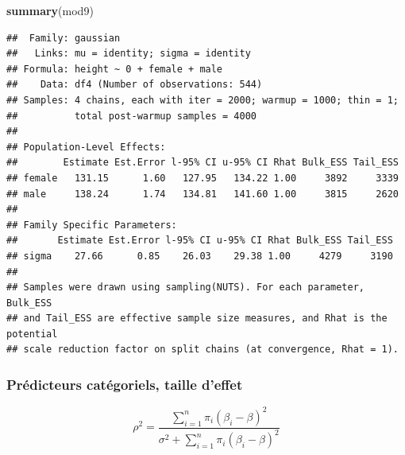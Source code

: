 \documentclass[
  a4paper,11pt,twoside,onecolumn,openright,final,oldfontcommands]{memoir}
\newenvironment{Shaded}{\begin{snugshade}}{\end{snugshade}}
\newcommand{\CommentTok}[1]{\textcolor[rgb]{0.56,0.35,0.01}{\textit{#1}}}
\newcommand{\DecValTok}[1]{\textcolor[rgb]{0.00,0.00,0.81}{#1}}
\newcommand{\KeywordTok}[1]{\textcolor[rgb]{0.13,0.29,0.53}{\textbf{#1}}}
\newcommand{\NormalTok}[1]{#1}
\newcommand{\OperatorTok}[1]{\textcolor[rgb]{0.81,0.36,0.00}{\textbf{#1}}}
\newcommand{\StringTok}[1]{\textcolor[rgb]{0.31,0.60,0.02}{#1}}
\theoremstyle{definition}
\theoremstyle{definition}
\theoremstyle{definition}
\theoremstyle{remark}
\begin{document}
\begin{Shaded}
\begin{Highlighting}[]
\KeywordTok{summary}\NormalTok{(mod9)}
\end{Highlighting}
\end{Shaded}

\begin{verbatim}
##  Family: gaussian 
##   Links: mu = identity; sigma = identity 
## Formula: height ~ 0 + female + male 
##    Data: df4 (Number of observations: 544) 
## Samples: 4 chains, each with iter = 2000; warmup = 1000; thin = 1;
##          total post-warmup samples = 4000
## 
## Population-Level Effects: 
##        Estimate Est.Error l-95% CI u-95% CI Rhat Bulk_ESS Tail_ESS
## female   131.15      1.60   127.95   134.22 1.00     3892     3339
## male     138.24      1.74   134.81   141.60 1.00     3815     2620
## 
## Family Specific Parameters: 
##       Estimate Est.Error l-95% CI u-95% CI Rhat Bulk_ESS Tail_ESS
## sigma    27.66      0.85    26.03    29.38 1.00     4279     3190
## 
## Samples were drawn using sampling(NUTS). For each parameter, Bulk_ESS
## and Tail_ESS are effective sample size measures, and Rhat is the potential
## scale reduction factor on split chains (at convergence, Rhat = 1).
\end{verbatim}

\hypertarget{pruxe9dicteurs-catuxe9goriels-taille-deffet}{%
\subsubsection{Prédicteurs catégoriels, taille d'effet}\label{pruxe9dicteurs-catuxe9goriels-taille-deffet}}

\[
\rho^{2} = \dfrac{\sum_{i=1}^{n} \pi_{i}(\beta_{i} - \beta)^{2}}{\sigma^{2} + \sum_{i = 1}^{n} \pi_{i}(\beta_{i} - \beta)^{2}}
\]

\begin{Shaded}
\end{Shaded}
\end{document}
